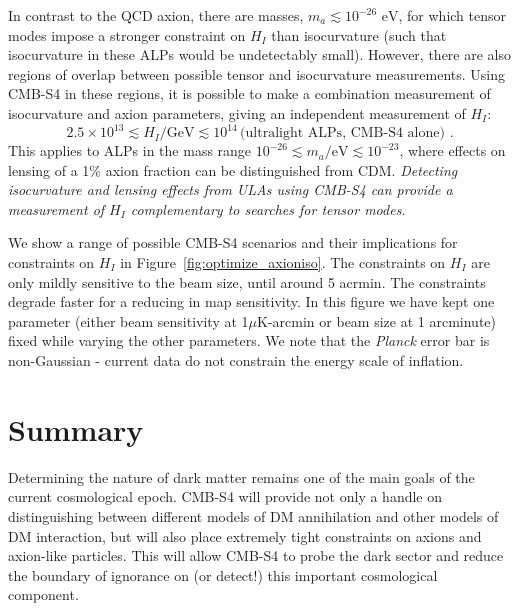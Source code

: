 In contrast to the QCD axion, there are masses, $m_a\lesssim 10^{-26}\text{ eV}$, for which tensor modes impose a stronger constraint on $H_I$ than isocurvature (such that isocurvature in these ALPs would be undetectably small). However, there are also regions of overlap between possible tensor and isocurvature measurements. Using CMB-S4 in these regions, it is possible to make a combination measurement of isocurvature and axion parameters, giving an independent measurement of $H_I$:
\begin{equation} 2.5\times 10^{13}\lesssim H_I/\text{GeV}\lesssim 10^{14}\,
\text{(ultralight ALPs, CMB-S4 alone)}\,\,.
\end{equation}
This applies to ALPs in the mass range $10^{-26}\lesssim m_a/\text{eV}\lesssim 10^{-23}$, where effects on lensing of a 1\% axion fraction can be distinguished from CDM. \emph{Detecting isocurvature and lensing effects from ULAs using CMB-S4 can provide a measurement of $H_I$ complementary to searches for tensor modes.}%

We show a range of possible CMB-S4 scenarios and their implications for constraints on $H_I$ in Figure~\ref{fig:optimize_axioniso}. The constraints on $H_I$ are only mildly sensitive to the beam size, until around 5 acrmin. The constraints degrade faster for a reducing in map sensitivity. In this figure we have kept one parameter (either beam sensitivity at 1$\mu$K-arcmin or beam size at 1 arcminute) fixed while varying the other parameters. We note that the \textit{Planck} error bar is non-Gaussian - current data do not constrain the energy scale of inflation.
 
\section{Summary}
Determining the nature of dark matter remains one of the main goals of the current cosmological epoch. CMB-S4 will provide not only a handle on distinguishing between different models of DM annihilation and other models of DM interaction, but will also place extremely tight constraints on axions and axion-like particles. This will allow CMB-S4 to probe the dark sector and reduce the boundary of ignorance on (or detect!) this important cosmological component.


